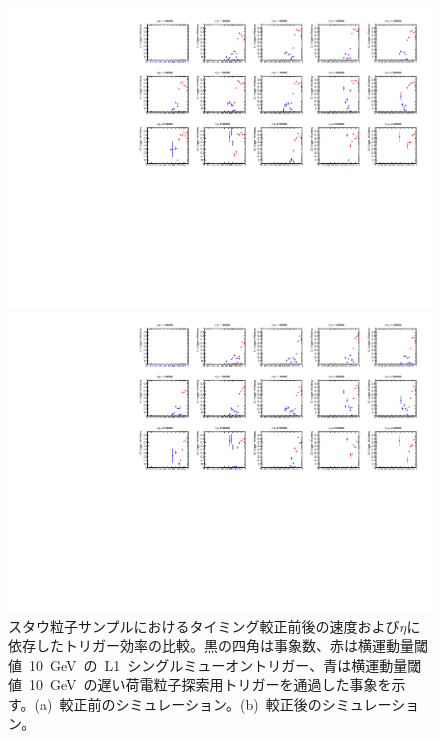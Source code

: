 \begin{figure}[H]
    \begin{minipage}{0.49\hsize}
    \centering   
    \includegraphics[width=\textwidth,page=16]{img/rec/stau_600_ori.pdf}
    \subcaption{}
    \end{minipage}
    \begin{minipage}{0.49\hsize}
    \centering   
    \includegraphics[width=\textwidth,page=16]{img/rec/stau_600.pdf}
    \subcaption{}
    \end{minipage}
    \caption[スタウ粒子サンプルにおけるタイミング較正前後の速度および$\eta$に依存したトリガー効率の比較]{スタウ粒子サンプルにおけるタイミング較正前後の速度および$\eta$に依存したトリガー効率の比較。黒の四角は事象数、赤は横運動量閾値~10~GeV~の~L1~シングルミューオントリガー、青は横運動量閾値~10~GeV~の遅い荷電粒子探索用トリガーを通過した事象を示す。(a)~較正前のシミュレーション。(b)~較正後のシミュレーション。}\label{fig:trietabeta}
\end{figure}

